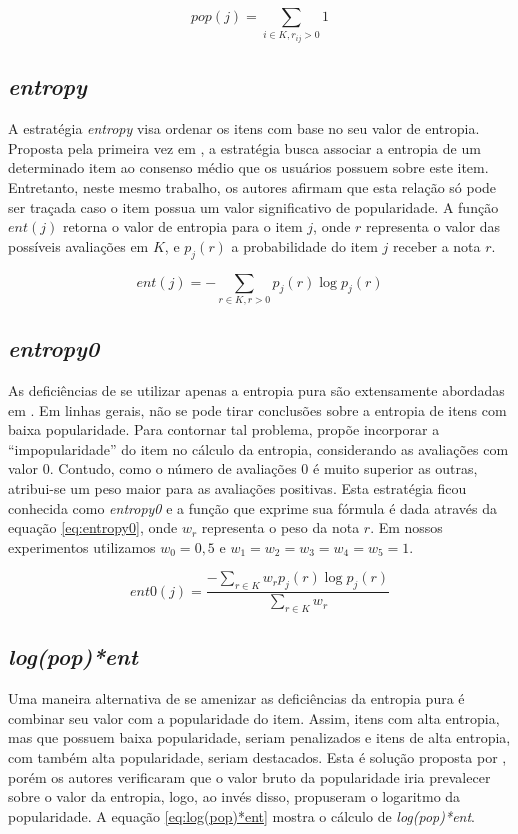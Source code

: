 \begin{equation}
pop(j) = \sum_{i \in K, r_{ij} > 0} 1
\label{eq:popularity}
\end{equation}

\subsection{\textit{entropy}}
A estratégia \textit{entropy} visa ordenar os itens com base no seu valor de entropia. Proposta pela primeira vez em \citep{Rashid:2002:GKY:502716.502737}, a estratégia busca associar a entropia de um determinado item ao consenso médio que os usuários possuem sobre este item. Entretanto, neste mesmo trabalho, os autores afirmam que esta relação só pode ser traçada caso o item possua um valor significativo de popularidade. A função $ent(j)$ retorna o valor de entropia para o item $j$, onde $r$ representa o valor das possíveis avaliações em $K$, e $p_j(r)$ a probabilidade do item $j$ receber a nota $r$.

\begin{equation}
ent(j) = -\sum_{r \in K, r > 0} p_j(r) \log p_j(r)
\label{entropy}
\end{equation}

\subsection{\textit{entropy0}}
As deficiências de se utilizar apenas a entropia pura são extensamente abordadas em \citep{Rashid:2008:LPN:1540276.1540302}. Em linhas gerais, não se pode tirar conclusões sobre a entropia de itens com baixa popularidade. Para contornar tal problema, \citep{Rashid:2008:LPN:1540276.1540302} propõe incorporar a ``impopularidade'' do item no cálculo da entropia, considerando as avaliações com valor 0. Contudo, como o número de avaliações 0 é muito superior as outras, atribui-se um peso maior para as avaliações positivas. Esta estratégia ficou conhecida como \textit{entropy0} e a função que exprime sua fórmula é dada através da equação \ref{eq:entropy0}, onde $w_r$ representa o peso da nota $r$. Em nossos experimentos utilizamos $w_0=0,5$ e $w_1=w_2=w_3=w_4=w_5=1$.

\begin{equation}
ent0(j) = \frac{- \sum_{r \in K} w_r p_j(r) \log p_j(r)}{\sum_{r \in K} w_r}
\label{eq:entropy0}
\end{equation}

\subsection{\textit{log(pop)*ent}}
Uma maneira alternativa de se amenizar as deficiências da entropia pura é combinar seu valor com a popularidade do item. Assim, itens com alta entropia, mas que possuem baixa popularidade, seriam penalizados e itens de alta entropia, com também alta popularidade, seriam destacados. Esta é solução proposta por \citep{Rashid:2002:GKY:502716.502737}, porém os autores verificaram que o valor bruto da popularidade iria prevalecer sobre o valor da entropia, logo, ao invés disso, propuseram o logaritmo da popularidade. A equação \ref{eq:log(pop)*ent} mostra o cálculo de \textit{log(pop)*ent}.

